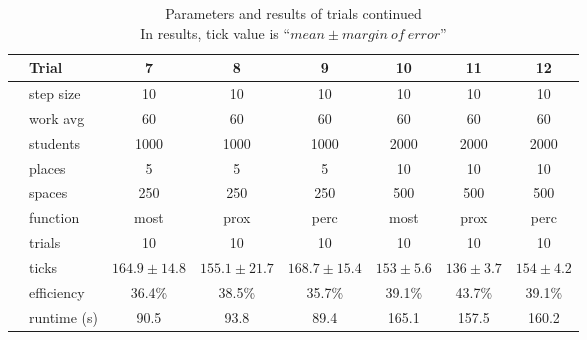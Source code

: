 \documentclass[11pt]{article} %
\begin{document}

\begin{table}[]
\footnotesize
\centering
\begin{tabular}{l|l|ccc|ccc}
 & Trial & 7 & 8 & 9 & 10 & 11 & 12  \\ \hline
  \parbox[t]{2mm}{} 
 & step size 	& 10  			& 10  			& 10 			& 10 					& 10 				& 10  \\
 & work avg 	& 60 			&  60 			& 60			& 60 					& 60 				& 60 \\
 & students 	& 1000 			& 1000 			& 1000 			& 2000 					& 2000 				& 2000 \\
 & places 		& 5 			& 5 			& 5 			& 10 					& 10 				& 10 \\
 & spaces 		& 250 			& 250 			& 250 			& 500 					& 500 				& 500 \\
 & function 	& most 			& prox 			& perc 			& most 					& prox 				& perc \\
 & trials 		& 10 			& 10 			& 10 			& 10 					& 10 				& 10 \\ \hline
\parbox[t]{2mm}{} 
 & ticks 		& $164.9\pm 14.8$ 	& $155.1\pm 21.7$ 	& $168.7\pm 15.4 $	& $153\pm 5.6 $	& $136\pm 3.7 $	& $154\pm 4.2$ \\
 & efficiency 	& 36.4\%			& 38.5\%			& 35.7\%				& 39.1\%				& 43.7\%				& 39.1\% \\
 & runtime (s) 	& 90.5			& 	93.8		& 	89.4			& 165.1			& 157.5			& 160.2
\end{tabular}
\caption{Parameters and results of trials continued \\ \footnotesize In results, tick value is ``$mean \pm margin \: of \: error$''}
\end{table}

\end{document}
